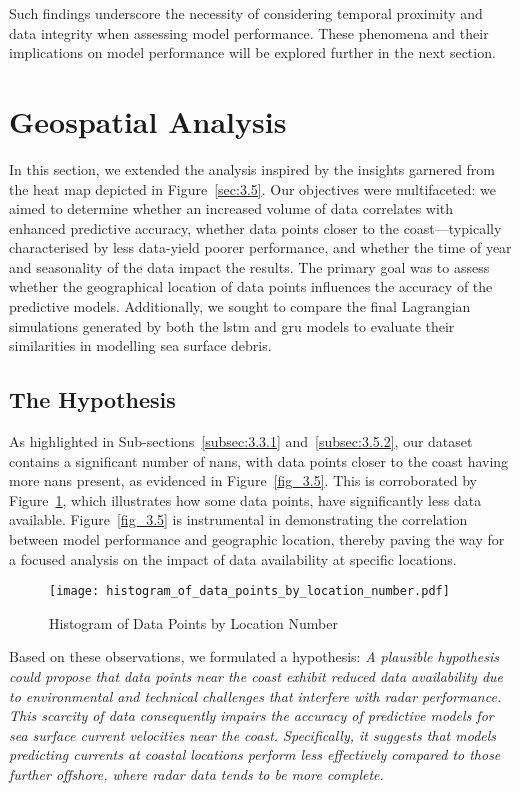 Such findings underscore the necessity of considering temporal proximity and data integrity when assessing model performance. These phenomena and their implications on model performance will be explored further in the next section.

\section{Geospatial Analysis}
\label{sec:4.2}

In this section, we extended the analysis inspired by the insights garnered from the heat map depicted in Figure~\ref{sec:3.5}. Our objectives were multifaceted: we aimed to determine whether an increased volume of data correlates with enhanced predictive accuracy, whether data points closer to the coast—typically characterised by less data-yield poorer performance, and whether the time of year and seasonality of the data impact the results. The primary goal was to assess whether the geographical location of data points influences the accuracy of the predictive models. Additionally, we sought to compare the final Lagrangian simulations generated by both the \acrshort{lstm} and \acrshort{gru} models to evaluate their similarities in modelling sea surface debris.

\subsection{The Hypothesis}
\label{subsec:4.2.1}

As highlighted in Sub-sections~\ref{subsec:3.3.1} and~\ref{subsec:3.5.2}, our dataset contains a significant number of \acrshort{nan}s, with data points closer to the coast having more \acrshort{nan}s present, as evidenced in Figure~\ref{fig_3.5}. This is corroborated by Figure~\ref{fig_4.1}, which illustrates how some data points, have significantly less data available. Figure~\ref{fig_3.5} is instrumental in demonstrating the correlation between model performance and geographic location, thereby paving the way for a focused analysis on the impact of data availability at specific locations. 

\begin{figure}[htbp]
    \centering
    \texttt{[image: histogram\_of\_data\_points\_by\_location\_number.pdf]}
    \caption[Short sample caption.]{Histogram of Data Points by Location Number\label{fig_4.1}}
\end{figure}

Based on these observations, we formulated a hypothesis: \textit{A plausible hypothesis could propose that data points near the coast exhibit reduced data availability due to environmental and technical challenges that interfere with radar performance. This scarcity of data consequently impairs the accuracy of predictive models for sea surface current velocities near the coast. Specifically, it suggests that models predicting currents at coastal locations perform less effectively compared to those further offshore, where radar data tends to be more complete.}

